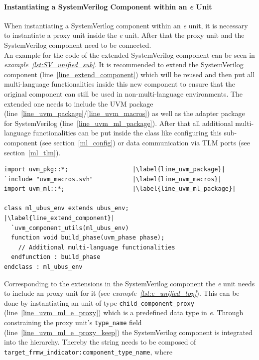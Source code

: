 \paragraph{Instantiating a SystemVerilog Component within an \textit{e} Unit}
\label{sv_inside_e}
When instantiating a SystemVerilog component within an \textit{e} unit,
it is necessary to instantiate a proxy unit inside the \textit{e} unit. After that the
proxy unit and the SystemVerilog component need to be connected. \\
An example for the code of the extended SystemVerilog component can be seen in
\emph{example~\ref{lst:SV_unified_sub}}.
It is recommended to extend the SystemVerilog component
(line~\ref{line_extend_component}) which will
be reused and then put all multi-language functionalities inside this new
component to ensure that the original component can still be used in
non-multi-language environments. The extended one needs to include the UVM
package (line~\ref{line_uvm_package}/\ref{line_uvm_macros}) as well as the adapter
package for SystemVerilog (line~\ref{line_uvm_ml_package}).
After that all additional multi-language functionalities can be put inside the
class like configuring this sub-component (see section~\ref{ml_config}) or data
communication via TLM ports (see section~\ref{ml_tlm}).
\medskip
{}
\begin{lstlisting}[frame=htrbl, caption={SystemVerilog: extended component}, label={lst:SV_unified_sub}]
import uvm_pkg::*;					|\label{line_uvm_package}|
`include "uvm_macros.svh"			|\label{line_uvm_macros}|
import uvm_ml::*;					|\label{line_uvm_ml_package}|

class ml_ubus_env extends ubus_env;			|\label{line_extend_component}|
  `uvm_component_utils(ml_ubus_env)
  function void build_phase(uvm_phase phase);
    // Additional multi-language functionalities
  endfunction : build_phase
endclass : ml_ubus_env
\end{lstlisting}
\medskip
Corresponding to the extensions in the SystemVerilog component the \textit{e}
unit needs to include an proxy unit for it (see \emph{example~\ref{lst:e_unified_top}}).
This can be done by instantiating an unit of type
\lstinline$child_component_proxy$ (line~\ref{line_uvm_ml_e_proxy}) which is a
predefined data type in \textit{e}.
Through constraining the proxy unit's \lstinline$type_name$ field
(line~\ref{line_uvm_ml_e_proxy_keep}) the
SystemVerilog component is integrated into the hierarchy. Thereby the string
needs to be composed of \lstinline$target_frmw_indicator:component_type_name$, where
